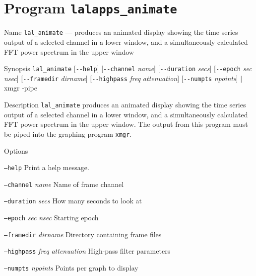 \section{Program \texttt{lalapps\_animate}}
\label{program:lalapps-animate}

\begin{entry}

\item[Name]
\verb$lal_animate$ --- produces an animated display showing the time
series output of a selected channel in a lower window, and a simultaneously
calculated FFT power spectrum in the upper window

\item[Synopsis]
\verb$lal_animate$ [\verb$--help$] [\verb$--channel$ \textit{name}] 
[\verb$--duration$ \textit{secs}] [\verb$--epoch$ \textit{sec}
\textit{nsec}] [\verb$--framedir$ \textit{dirname}] 
[\verb$--highpass$ \textit{freq} \textit{attenuation}]
[\verb$--numpts$ \textit{npoints}] $|$ xmgr -pipe


\item[Description]
\verb$lal_animate$ produces an animated display showing the time
series output of a selected channel in a lower window, and a simultaneously
calculated FFT power spectrum in the upper window.  The output from
this program must be piped into the graphing program \texttt{xmgr}.

\item[Options]\leavevmode
\begin{entry}
\item[\texttt{--help}]
Print a help message.
\item[\texttt{--channel} \textit{name}]
Name of frame channel
\item[\texttt{--duration} \textit{secs}] 
How many seconds to look at
\item[\texttt{--epoch} \textit{sec} \textit{nsec}] 
Starting epoch
\item[\texttt{--framedir} \textit{dirname}] 
Directory containing frame files
\item[\texttt{--highpass} \textit{freq} \textit{attenuation}]
High-pass filter parameters
\item[\texttt{--numpts} \textit{npoints}]
Points per graph to display
\end{entry}


\end{entry}
